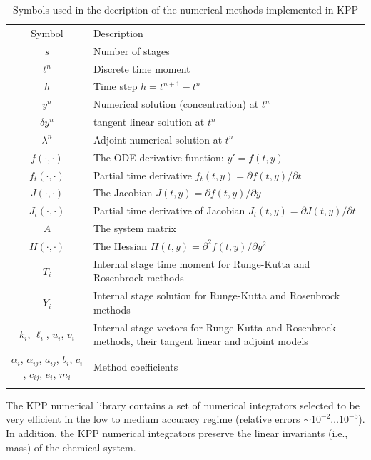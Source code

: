 \documentclass[twoside]{article}
\newcommand{\hhline}{\noalign{\vspace{1mm}}\hline\noalign{\vspace{1mm}}}
\begin{document}
\begin{table}
\begin{center}
\caption{Symbols used in the decription of the numerical methods
  implemented in KPP}
\label{tab:symbols}
\begin{tabular}{cp{11cm}}
\hhline
Symbol & Description\\
\hhline
$s$                & Number of stages\\
$t^n$              & Discrete time moment\\
$h$                & Time step   $h=t^{n+1}-t^n$\\
$y^n$              & Numerical solution (concentration) at $t^n$\\
$\delta y^n$       & tangent linear solution at $t^n$\\
$\lambda^n$        & Adjoint numerical solution at $t^n$\\
$f(\cdot,\cdot)$   & The ODE derivative function: $y'=f(t,y)$\\
$f_t(\cdot,\cdot)$ & Partial time derivative $f_t(t,y)=\partial f(t,y)/\partial t$\\
$J(\cdot,\cdot)$   & The Jacobian $J(t,y)=\partial f(t,y)/\partial y$\\
$J_t(\cdot,\cdot)$ & Partial time derivative of Jacobian $J_t(t,y)=\partial J(t,y)/\partial t$\\
$A$                & The system matrix\\
$H(\cdot,\cdot)$   & The Hessian $H(t,y)=\partial^2 f(t,y)/\partial y^2$\\
$T_i$              & Internal stage time moment for Runge-Kutta and Rosenbrock methods\\
$Y_i$              & Internal stage solution for Runge-Kutta and Rosenbrock methods\\
$k_i$, $\ell_i$, $u_i$, $v_i$
                   & Internal stage vectors for Runge-Kutta and Rosenbrock
                     methods, their tangent linear and adjoint models\\
$\alpha_i$, $\alpha_{ij}$, $a_{ij}$, $b_i$, $c_i$, $c_{ij}$, $e_i$, $m_i$
                   & Method coefficients\\
\hhline
\end{tabular}
\end{center}
\end{table}

The KPP numerical library contains a set of numerical integrators
selected to be very efficient in the low to medium accuracy regime
(relative errors $\sim 10^{-2} \dots 10^{-5}$). In addition, the KPP
numerical integrators preserve the linear invariants (i.e., mass) of the
chemical system.
\end{document}
